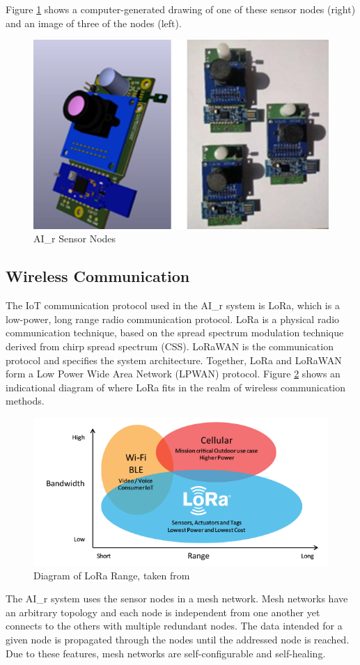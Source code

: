 \documentclass[a4paper,twoside,12pt]{report}
\begin{document}
Figure \ref{fig:SensorNodes} shows a computer-generated drawing of one of these sensor nodes (right) and an image of three of the nodes (left).

\begin{figure}[ht]
	\centering
	\includegraphics[width=0.5\linewidth]{images/SensorNodes.png}
	\caption{AI\_r Sensor Nodes}
	\label{fig:SensorNodes}
\end{figure}

\subsection{Wireless Communication}
The IoT communication protocol used in the AI\_r system is LoRa, which is a low-power, long range radio communication protocol. LoRa is a physical radio communication technique, based on the spread spectrum modulation technique derived from chirp spread spectrum (CSS)\citep{Semtech_2023}. LoRaWAN is the communication protocol and specifies the system architecture. Together, LoRa and LoRaWAN form a Low Power Wide Area Network (LPWAN) protocol. Figure \ref{fig:LoRaRange} shows an indicational diagram of where LoRa fits in the realm of wireless communication methods.

\begin{figure}[ht]
	\centering
	\includegraphics[width=0.5\linewidth]{images/LoRa_Why_Range.png}
	\caption{Diagram of LoRa Range, taken from \cite{Semtech_2023}}
	\label{fig:LoRaRange}
\end{figure}

The AI\_r system uses the sensor nodes in a mesh network. Mesh networks have an arbitrary topology and each node is independent from one another yet connects to the others with multiple redundant nodes. The data intended for a given node is propagated through the nodes until the addressed node is reached. Due to these features, mesh networks are self-configurable and self-healing.
\newline
\end{document}
